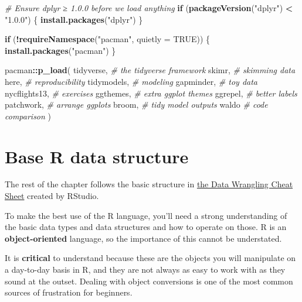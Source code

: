\documentclass[
]{book}
\newenvironment{Shaded}{\begin{snugshade}}{\end{snugshade}}
\newcommand{\AttributeTok}[1]{\textcolor[rgb]{0.13,0.29,0.53}{#1}}
\newcommand{\CommentTok}[1]{\textcolor[rgb]{0.56,0.35,0.01}{\textit{#1}}}
\newcommand{\ConstantTok}[1]{\textcolor[rgb]{0.56,0.35,0.01}{#1}}
\newcommand{\ControlFlowTok}[1]{\textcolor[rgb]{0.13,0.29,0.53}{\textbf{#1}}}
\newcommand{\FunctionTok}[1]{\textcolor[rgb]{0.13,0.29,0.53}{\textbf{#1}}}
\newcommand{\NormalTok}[1]{#1}
\newcommand{\SpecialCharTok}[1]{\textcolor[rgb]{0.81,0.36,0.00}{\textbf{#1}}}
\newcommand{\StringTok}[1]{\textcolor[rgb]{0.31,0.60,0.02}{#1}}
\begin{document}
\begin{Shaded}
\begin{Highlighting}[]
\CommentTok{\# Ensure dplyr ≥ 1.0.0 before we load anything}
\ControlFlowTok{if}\NormalTok{ (}\FunctionTok{packageVersion}\NormalTok{(}\StringTok{"dplyr"}\NormalTok{) }\SpecialCharTok{\textless{}} \StringTok{"1.0.0"}\NormalTok{) \{}
  \FunctionTok{install.packages}\NormalTok{(}\StringTok{"dplyr"}\NormalTok{)}
\NormalTok{\}}

\ControlFlowTok{if}\NormalTok{ (}\SpecialCharTok{!}\FunctionTok{requireNamespace}\NormalTok{(}\StringTok{"pacman"}\NormalTok{, }\AttributeTok{quietly =} \ConstantTok{TRUE}\NormalTok{)) \{}
  \FunctionTok{install.packages}\NormalTok{(}\StringTok{"pacman"}\NormalTok{)}
\NormalTok{\}}

\NormalTok{pacman}\SpecialCharTok{::}\FunctionTok{p\_load}\NormalTok{(}
\NormalTok{  tidyverse,      }\CommentTok{\# the tidyverse framework}
\NormalTok{  skimr,          }\CommentTok{\# skimming data}
\NormalTok{  here,           }\CommentTok{\# reproducibility}
\NormalTok{  tidymodels,     }\CommentTok{\# modeling}
\NormalTok{  gapminder,      }\CommentTok{\# toy data}
\NormalTok{  nycflights13,   }\CommentTok{\# exercises}
\NormalTok{  ggthemes,       }\CommentTok{\# extra ggplot themes}
\NormalTok{  ggrepel,        }\CommentTok{\# better labels}
\NormalTok{  patchwork,      }\CommentTok{\# arrange ggplots}
\NormalTok{  broom,          }\CommentTok{\# tidy model outputs}
\NormalTok{  waldo           }\CommentTok{\# code comparison}
\NormalTok{)}
\end{Highlighting}
\end{Shaded}

\section{Base R data structure}\label{base-r-data-structure}

The rest of the chapter follows the basic structure in \href{https://rstudio.com/wp-content/uploads/2015/02/data-wrangling-cheatsheet.pdf}{the Data Wrangling Cheat Sheet} created by RStudio.

To make the best use of the R language, you'll need a strong understanding of the basic data types and data structures and how to operate on those. R is an \textbf{object-oriented} language, so the importance of this cannot be understated.

It is \textbf{critical} to understand because these are the objects you will manipulate on a day-to-day basis in R, and they are not always as easy to work with as they sound at the outset. Dealing with object conversions is one of the most common sources of frustration for beginners.
\end{document}
